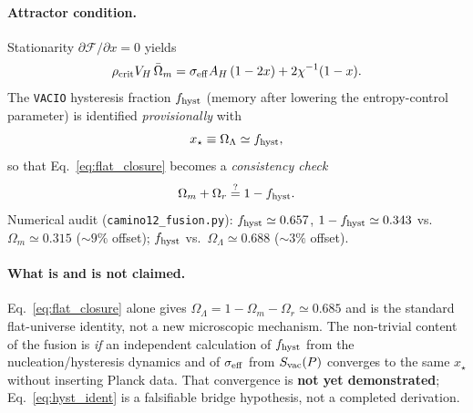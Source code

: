 \paragraph{Attractor condition.}
Stationarity $\partial\mathcal{F}/\partial x=0$ yields
\begin{equation}
\label{eq:attractor_x}
\rho_{\rm crit}V_H\,\bar\Omega_m
=
\sigma_{\rm eff}A_H\,(1-2x)
+
2\chi^{-1}(1-x).
\end{equation}
The \texttt{VACIO} hysteresis fraction $f_{\rm hyst}$ (memory after
lowering the entropy-control parameter) is identified \emph{provisionally} with
\begin{equation}
\label{eq:hyst_ident}
x_\star \equiv \Omega_\Lambda \simeq f_{\rm hyst},
\end{equation}
so that Eq.~\eqref{eq:flat_closure} becomes a \emph{consistency check}
\begin{equation}
\label{eq:matter_from_hyst}
\Omega_m + \Omega_r \stackrel{?}{=} 1-f_{\rm hyst}.
\end{equation}
Numerical audit (\texttt{camino12\_fusion.py}): $f_{\rm hyst}\simeq 0.657$,
$1-f_{\rm hyst}\simeq 0.343$ vs.\ $\Omega_m\simeq 0.315$ ($\sim 9\%$ offset);
$f_{\rm hyst}$ vs.\ $\Omega_\Lambda\simeq 0.688$ ($\sim 3\%$ offset).

\paragraph{What is and is not claimed.}
Eq.~\eqref{eq:flat_closure} alone gives
$\Omega_\Lambda=1-\Omega_m-\Omega_r\simeq 0.685$ and is the standard
flat-universe identity, not a new microscopic mechanism.
The non-trivial content of the fusion is \emph{if} an independent
calculation of $f_{\rm hyst}$ from the nucleation/hysteresis dynamics
and of $\sigma_{\rm eff}$ from $S_{\rm vac}(P)$ converges to the same
$x_\star$ without inserting Planck data.
That convergence is \textbf{not yet demonstrated}; Eq.~\eqref{eq:hyst_ident}
is a falsifiable bridge hypothesis, not a completed derivation.
